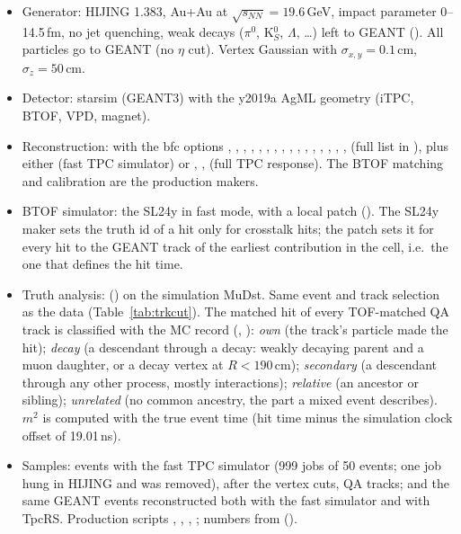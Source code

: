 \begin{itemize}
\item Generator: HIJING 1.383, Au+Au at $\sqrt{s_{NN}}=19.6$\,GeV, impact parameter 0--14.5\,fm, no jet quenching, weak decays
  ($\pi^0$, K$^0_S$, $\Lambda$, \ldots) left to GEANT (). All particles go to GEANT (no $\eta$ cut).
  Vertex Gaussian with $\sigma_{x,y}=0.1$\,cm, $\sigma_z=50$\,cm.
\item Detector: starsim (GEANT3) with the y2019a AgML geometry (iTPC, BTOF, VPD, magnet).
\item Reconstruction:  with the bfc options , , , ,
  , , , , , , , ,
  , , , ,  (full list in ), plus either
   (fast TPC simulator) or , ,  (full TPC response). The BTOF matching and calibration are the production makers.
\item BTOF simulator: the SL24y  in fast mode, with a local patch (). The SL24y
  maker sets the truth id of a hit only for crosstalk hits; the patch sets it for every hit to the GEANT track of the earliest
  contribution in the cell, i.e.\ the one that defines the hit time.
\item Truth analysis:  () on the simulation MuDst. Same event and track
  selection as the data (Table~\ref{tab:trkcut}). The matched hit of every TOF-matched QA track is classified with the MC record
  (, ):
  \emph{own} (the track's particle made the hit); \emph{decay} (a descendant through a decay: weakly decaying parent and a muon daughter,
  or a decay vertex at $R<190$\,cm); \emph{secondary} (a descendant through any other process, mostly interactions); \emph{relative}
  (an ancestor or sibling); \emph{unrelated} (no common ancestry, the part a mixed event describes).
  $m^2$ is computed with the true event time (hit time minus the simulation clock offset of 19.01\,ns).
\item Samples: \simEvGen{} events with the fast TPC simulator (999 jobs of 50 events; one job hung in HIJING and was removed),
  \simEvAna{} after the vertex cuts, \simNTrk{} QA tracks; and the same \simEvGenOneK{} GEANT events reconstructed both with the fast
  simulator and with TpcRS. Production scripts , , ,
  ; numbers from  ().
\end{itemize}

